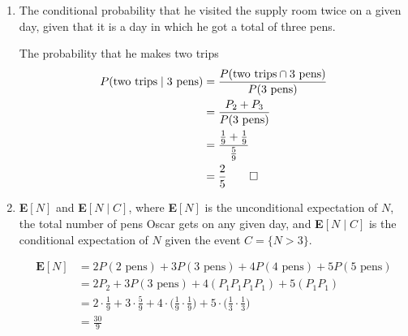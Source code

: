 \documentclass[paper=usletter, fontsize=12pt]{article}
\begin{document}
\begin{enumerate}
\begin{enumerate}
\begin{cproof}
            \end{cproof}

            \item The conditional probability that he visited the supply room
            twice on a given day, given that it is a day in which he got a
            total of three pens.
            \begin{cproof}

                The probability that he makes two trips
                \begin{align*}
                    P(\text{two trips} \mid \text{3 pens}) & =
                    \frac{P(\text{two trips} \cap \text{3 pens})}{P(\text{3
                    pens})} \\
                    & = \frac{P_2 + P_3}{P(\text{3 pens})} \\
                    & = \frac{\frac{1}{9} + \frac{1}{9}}{\frac{5}{9}} \\
                    & = \frac{2}{5} \qedhere
                \end{align*}
                \endgroup

            \end{cproof}

            \item \textbf{E}$[N]$ and \textbf{E}$[N \mid C]$, where
            \textbf{E}$[N]$ is the unconditional expectation of $N$, the total
            number of pens Oscar gets on any given day, and \textbf{E}$[N \mid
            C]$ is the conditional expectation of $N$ given the event
            $C=\{N>3\}$.
            \begin{cproof}

                \begin{align*}
                    \textbf{E}[N] & = 2P(\text{2 pens}) + 3P(\text{3 pens}) + 4P(\text{4 pens}) + 5P(\text{5 pens}) \\
                    & = 2P_2 + 3P(\text{3 pens}) + 4(P_1P_1P_1P_1) + 5(P_1P_1) \\
                    & = 2\cdot\frac{1}{9} + 3\cdot\frac{5}{9} + 4\cdot\bigg(\frac{1}{9}\cdot\frac{1}{9}\bigg) + 5\cdot\bigg(\frac{1}{3}\cdot\frac{1}{3}\bigg)\\
                    & = \frac{30}{9}
                \end{align*}
                \endgroup


\end{cproof}
\end{enumerate}
\end{enumerate}
\end{document}
